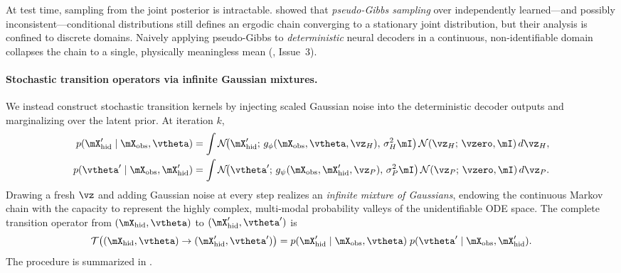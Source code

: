 At test time, sampling from the joint posterior is intractable. \citet{heckerman2000dependency}
showed that \textit{pseudo-Gibbs sampling} over independently learned---and possibly
inconsistent---conditional distributions still defines an ergodic chain converging to a stationary
joint distribution, but their analysis is confined to discrete domains. Naively applying pseudo-Gibbs
to \emph{deterministic} neural decoders in a continuous, non-identifiable domain collapses the chain
to a single, physically meaningless mean (, Issue~3).

\paragraph{Stochastic transition operators via infinite Gaussian mixtures.}
We instead construct stochastic transition kernels by injecting scaled Gaussian noise into the
deterministic decoder outputs and marginalizing over the latent prior. At iteration $k$,
\begin{align}
p(\mX_{\mathrm{hid}}' \mid \mX_{\mathrm{obs}}, \vtheta)
    &= \int \mathcal{N}\!\big(\mX_{\mathrm{hid}}' ;\, g_\phi(\mX_{\mathrm{obs}}, \vtheta, \vz_H),\, \sigma_H^2 \mI\big)\, \mathcal{N}(\vz_H ;\, \vzero, \mI)\, d\vz_H, \\
p(\vtheta' \mid \mX_{\mathrm{obs}}, \mX_{\mathrm{hid}}')
    &= \int \mathcal{N}\!\big(\vtheta' ;\, g_\psi(\mX_{\mathrm{obs}}, \mX_{\mathrm{hid}}', \vz_P),\, \sigma_P^2 \mI\big)\, \mathcal{N}(\vz_P ;\, \vzero, \mI)\, d\vz_P.
\end{align}
Drawing a fresh $\vz$ and adding Gaussian noise at every step realizes an \textit{infinite mixture of
Gaussians}, endowing the continuous Markov chain with the capacity to represent the highly complex,
multi-modal probability valleys of the unidentifiable ODE space. The complete transition operator
from $(\mX_{\mathrm{hid}}, \vtheta)$ to $(\mX_{\mathrm{hid}}', \vtheta')$ is
\begin{equation}
\label{eqn:kernel}
    \mathcal{T}\big((\mX_{\mathrm{hid}}, \vtheta) \to (\mX_{\mathrm{hid}}', \vtheta')\big)
    = p(\mX_{\mathrm{hid}}' \mid \mX_{\mathrm{obs}}, \vtheta)\; p(\vtheta' \mid \mX_{\mathrm{obs}}, \mX_{\mathrm{hid}}').
\end{equation}
The procedure is summarized in .

